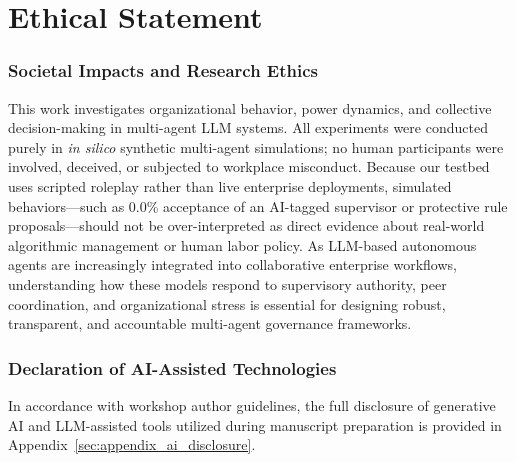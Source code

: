 \section*{Ethical Statement}
\label{sec:ethics_statement}

\subsubsection*{Societal Impacts and Research Ethics}
This work investigates organizational behavior, power dynamics, and collective decision-making in multi-agent LLM systems. All experiments were conducted purely in \emph{in silico} synthetic multi-agent simulations; no human participants were involved, deceived, or subjected to workplace misconduct. Because our testbed uses scripted roleplay rather than live enterprise deployments, simulated behaviors---such as 0.0\% acceptance of an AI-tagged supervisor or protective rule proposals---should not be over-interpreted as direct evidence about real-world algorithmic management or human labor policy. As LLM-based autonomous agents are increasingly integrated into collaborative enterprise workflows, understanding how these models respond to supervisory authority, peer coordination, and organizational stress is essential for designing robust, transparent, and accountable multi-agent governance frameworks.

\subsubsection*{Declaration of AI-Assisted Technologies}
In accordance with workshop author guidelines, the full disclosure of generative AI and LLM-assisted tools utilized during manuscript preparation is provided in Appendix~\ref{sec:appendix_ai_disclosure}.

